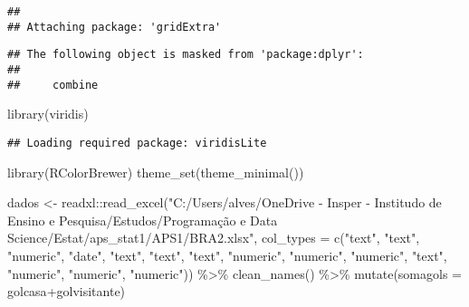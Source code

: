 \documentclass[
]{article}
\newenvironment{Shaded}{\begin{snugshade}}{\end{snugshade}}
\newcommand{\AttributeTok}[1]{\textcolor[rgb]{0.77,0.63,0.00}{#1}}
\newcommand{\FunctionTok}[1]{\textcolor[rgb]{0.00,0.00,0.00}{#1}}
\newcommand{\NormalTok}[1]{#1}
\newcommand{\OtherTok}[1]{\textcolor[rgb]{0.56,0.35,0.01}{#1}}
\newcommand{\SpecialCharTok}[1]{\textcolor[rgb]{0.00,0.00,0.00}{#1}}
\newcommand{\StringTok}[1]{\textcolor[rgb]{0.31,0.60,0.02}{#1}}
\begin{document}
\begin{verbatim}
## 
## Attaching package: 'gridExtra'
\end{verbatim}

\begin{verbatim}
## The following object is masked from 'package:dplyr':
## 
##     combine
\end{verbatim}

\begin{Shaded}
\begin{Highlighting}[]
\FunctionTok{library}\NormalTok{(viridis)}
\end{Highlighting}
\end{Shaded}

\begin{verbatim}
## Loading required package: viridisLite
\end{verbatim}

\begin{Shaded}
\begin{Highlighting}[]
\FunctionTok{library}\NormalTok{(RColorBrewer)}
\FunctionTok{theme\_set}\NormalTok{(}\FunctionTok{theme\_minimal}\NormalTok{())}

\NormalTok{dados }\OtherTok{\textless{}{-}}\NormalTok{ readxl}\SpecialCharTok{::}\FunctionTok{read\_excel}\NormalTok{(}\StringTok{"C:/Users/alves/OneDrive {-} Insper {-} Institudo de Ensino e Pesquisa/Estudos/Programação e Data Science/Estat/aps\_stat1/APS1/BRA2.xlsx"}\NormalTok{, }
                            \AttributeTok{col\_types =} \FunctionTok{c}\NormalTok{(}\StringTok{"text"}\NormalTok{, }\StringTok{"text"}\NormalTok{, }\StringTok{"numeric"}\NormalTok{, }
                                          \StringTok{"date"}\NormalTok{, }\StringTok{"text"}\NormalTok{, }\StringTok{"text"}\NormalTok{, }\StringTok{"text"}\NormalTok{, }\StringTok{"numeric"}\NormalTok{, }
                                          \StringTok{"numeric"}\NormalTok{, }\StringTok{"numeric"}\NormalTok{, }\StringTok{"text"}\NormalTok{, }\StringTok{"numeric"}\NormalTok{, }
                                          \StringTok{"numeric"}\NormalTok{, }\StringTok{"numeric"}\NormalTok{)) }\SpecialCharTok{\%\textgreater{}\%} \FunctionTok{clean\_names}\NormalTok{() }\SpecialCharTok{\%\textgreater{}\%} 
                            \FunctionTok{mutate}\NormalTok{(}\StringTok{\textquotesingle{}somagols\textquotesingle{}} \OtherTok{=}\NormalTok{ golcasa}\SpecialCharTok{+}\NormalTok{golvisitante)}
\end{Highlighting}
\end{Shaded}
\end{document}
